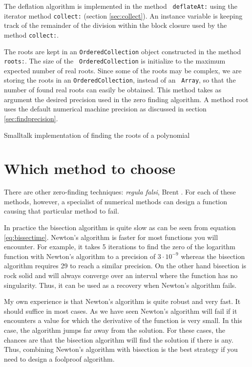 \documentclass[twoside]{book}
\begin{document}
The deflation algorithm is implemented in the method {\tt
deflateAt:} using the iterator method {\tt collect:} (\cf section
\ref{sec:collect}). An instance variable is keeping track of the
remainder of the division within the block closure used by the
method {\tt collect:}.

The roots are kept in an {\tt OrderedCollection} object
constructed in the method {\tt roots:}. The size of the {\tt
OrderedCollection} is initialize to the maximum expected number of
real roots. Since some of the roots may be complex, we are storing
the roots in an {\tt OrderedCollection}, instead of an {\tt
Array}, so that the number of found real roots can easily be
obtained. This method takes as argument the desired precision used
in the zero finding algorithm. A method root uses the default
numerical machine precision as discussed in section
\ref{sec:findprecision}.

\begin{listing} Smalltalk implementation of finding the roots of a polynomial \label{ls:polroots}

\end{listing}

\section{Which method to choose}
There are other zero-finding techniques: {\it regula falsi}, Brent
\cite{Press}. For each of these methods, however, a specialist of
numerical methods can design a function causing that particular
method to fail.

In practice the bisection algorithm is quite slow as can be seen
from equation \ref{eq:bissectime}. Newton's algorithm is faster
for most functions you will encounter. For example, it takes 5
iterations to find the zero of the logarithm function with
Newton's algorithm to a precision of $3\cdot 10^{-9}$ whereas the
bisection algorithm requires 29 to reach a similar precision. On
the other hand bisection is rock solid and will always converge
over an interval where the function has no singularity. Thus, it
can be used as a recovery when Newton's algorithm fails.

My own experience is that Newton's algorithm is quite robust and
very fast. It should suffice in most cases. As we have seen
Newton's algorithm will fail if it encounters a value for which
the derivative of the function is very small. In this case, the
algorithm jumps far away from the solution. For these cases, the
chances are that the bisection algorithm will find the solution if
there is any. Thus, combining Newton's algorithm with bisection is
the best strategy if you need to design a foolproof algorithm.
\end{document}
